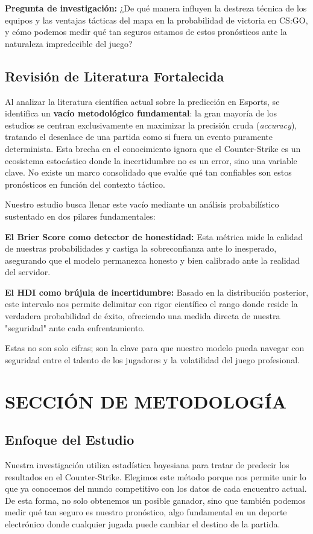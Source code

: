\documentclass[twocolumn,10pt]{article}
\begin{document}
\textbf{Pregunta de investigación:} ¿De qué manera influyen la destreza técnica de los equipos y las ventajas tácticas del mapa en la probabilidad de victoria en CS:GO, y cómo podemos medir qué tan seguros estamos de estos pronósticos ante la naturaleza impredecible del juego?

\subsection{Revisión de Literatura Fortalecida}
Al analizar la literatura científica actual sobre la predicción en Esports, se identifica un \textbf{vacío metodológico fundamental}: la gran mayoría de los estudios se centran exclusivamente en maximizar la precisión cruda (\textit{accuracy}), tratando el desenlace de una partida como si fuera un evento puramente determinista. Esta brecha en el conocimiento ignora que el Counter-Strike es un ecosistema estocástico donde la incertidumbre no es un error, sino una variable clave. No existe un marco consolidado que evalúe qué tan confiables son estos pronósticos en función del contexto táctico.

Nuestro estudio busca llenar este vacío mediante un análisis probabilístico sustentado en dos pilares fundamentales:

\textbf{El Brier Score como detector de honestidad:} Esta métrica mide la calidad de nuestras probabilidades y castiga la sobreconfianza ante lo inesperado, asegurando que el modelo permanezca honesto y bien calibrado ante la realidad del servidor.

\textbf{El HDI como brújula de incertidumbre:} Basado en la distribución posterior, este intervalo nos permite delimitar con rigor científico el rango donde reside la verdadera probabilidad de éxito, ofreciendo una medida directa de nuestra "seguridad" ante cada enfrentamiento.

Estas no son solo cifras; son la clave para que nuestro modelo pueda navegar con seguridad entre el talento de los jugadores y la volatilidad del juego profesional.

\section{SECCIÓN DE METODOLOGÍA}

\subsection{Enfoque del Estudio}
Nuestra investigación utiliza estadística bayesiana para tratar de predecir los resultados en el Counter-Strike. Elegimos este método porque nos permite unir lo que ya conocemos del mundo competitivo con los datos de cada encuentro actual. De esta forma, no solo obtenemos un posible ganador, sino que también podemos medir qué tan seguro es nuestro pronóstico, algo fundamental en un deporte electrónico donde cualquier jugada puede cambiar el destino de la partida.
\end{document}
